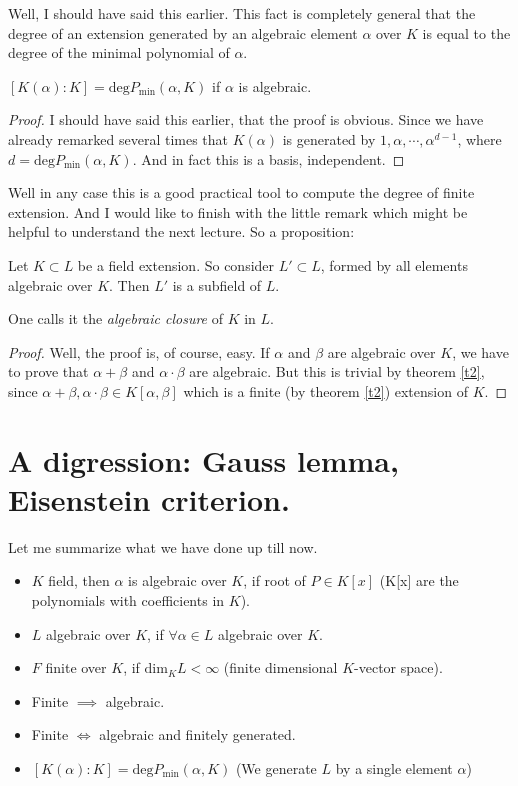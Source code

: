 Well, I should have said this earlier. This fact is completely general that the degree of an extension generated by an algebraic element $\alpha$ over $K$ is equal to the degree of the minimal polynomial of $\alpha$. 

\begin{proposition}
$\left[K(\alpha):K\right]=\text{deg}P_{\text{min}}(\alpha,K)$ if $\alpha$ is algebraic.
\end{proposition}
\begin{proof}
I should have said this earlier, that the proof is obvious. Since we have already remarked several times that $K(\alpha)$ is generated by $1, \alpha, \cdots, \alpha^{d-1}$, where $d=\text{deg}P_{\text{min}}(\alpha,K)$. And in fact this is a basis, independent. 
\end{proof}

Well in any case this is a good practical tool to compute the degree of finite extension. And I would like to finish with the little remark which might be helpful to understand the next lecture. So a proposition: 

\begin{proposition}
Let $K \subset L$ be a field extension. So consider $L'\subset L$, formed by all elements algebraic over $K$. Then $L'$ is a subfield of $L$. 
\end{proposition}

\begin{definition}
One calls it the \textit{algebraic closure} of $K$ in $L$.
\end{definition}

\begin{proof}
Well, the proof is, of course, easy. If $\alpha$ and $\beta$ are algebraic over $K$, we have to prove that $\alpha + \beta$ and $\alpha \cdot \beta$ are algebraic. But this is trivial by theorem \ref{t2}, since  $\alpha + \beta, \alpha \cdot \beta \in K[\alpha, \beta]$ which is a finite (by theorem \ref{t2}) extension of $K$.
\end{proof}


\section{A digression: Gauss lemma, Eisenstein criterion.}

Let me summarize what we have done up till now. 
\begin{itemize}
\item $K$ field, then $\alpha$ is algebraic over $K$, if root of $P\in K[x]$ (K[x] are the polynomials with coefficients in $K$).
\item $L$ algebraic over $K$, if $\forall \alpha \in L$ algebraic over $K$. 
\item $F$ finite over $K$, if $\text{dim}_KL<\infty$ (finite dimensional $K$-vector space). 
\item Finite $\implies$ algebraic. 
\item Finite $\iff$ algebraic and finitely generated. 
\item $\left[K(\alpha):K\right]=\text{deg}P_{\text{min}}(\alpha, K)$ (We generate $L$ by a single element $\alpha$)
\end{itemize}

